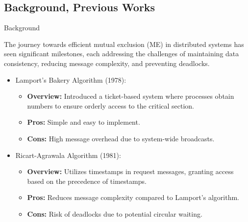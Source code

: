 \documentclass[11pt]{beamer}              %
\begin{document}
\subsection{Background, Previous Works}
\begin{frame}{Background}

The journey towards efficient mutual exclusion (ME) in distributed systems has seen significant milestones, each addressing the challenges of maintaining data consistency, reducing message complexity, and preventing deadlocks.

\begin{itemize}
  \item Lamport's Bakery Algorithm (1978):
    \begin{itemize}
      \item \textbf{Overview:} Introduced a ticket-based system where processes obtain numbers to ensure orderly access to the critical section.
      \item \textbf{Pros:} Simple and easy to implement.
      \item \textbf{Cons:} High message overhead due to system-wide broadcasts.
    \end{itemize}
  
    \item Ricart-Agrawala Algorithm (1981):
      \begin{itemize}
        \item \textbf{Overview:} Utilizes timestamps in request messages, granting access based on the precedence of timestamps.
        \item \textbf{Pros:} Reduces message complexity compared to Lamport's algorithm.
        \item \textbf{Cons:} Risk of deadlocks due to potential circular waiting.
      \end{itemize}
\end{itemize}
\end{frame}
\end{document}
